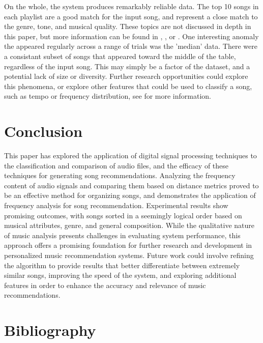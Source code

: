 \documentclass[conference]{IEEEtran}
\begin{document}
On the whole, the system produces remarkably reliable data. The top 10 songs in each playlist are a good match for the input song, and represent a close match to the genre, tone, and musical quality. These topics are not discussed in depth in this paper, but more information can be found in \cite{gothamOPENMUSICTHEORY2021}, \cite{hongdanIntelligentMusicGenre2022}, or \cite{silverGenreComplexesPopular2016}. One interesting anomaly the appeared regularly across a range of trials was the 'median' data. There were a consistant subset of songs that appeared toward the middle of the table, regardless of the input song. This may simply be a factor of the dataset, and a potential lack of size or diversity. Further research opportunities could explore this phenomena, or explore other features that could be used to classify a song, such as tempo or frequency distribution, see \cite{mengMusicGenreClassification} for more information.

\section{Conclusion}
This paper has explored the application of digital signal processing techniques to the classification and comparison of audio files, and the efficacy of these techniques for generating song recommendations. Analyzing the frequency content of audio signals and comparing them based on distance metrics proved to be an effective method for organizing songs, and demonstrates the application of frequency analysis for song recommendation. Experimental results show promising outcomes, with songs sorted in a seemingly logical order based on musical attributes, genre, and general composition. While the qualitative nature of music analysis presents challenges in evaluating system performance, this approach offers a promising foundation for further research and development in personalized music recommendation systems. Future work could involve refining the algorithm to provide results that better differentiate between extremely similar songs, improving the speed of the system, and exploring additional features in order to enhance the accuracy and relevance of music recommendations.

\section{Bibliography}


\end{document}
